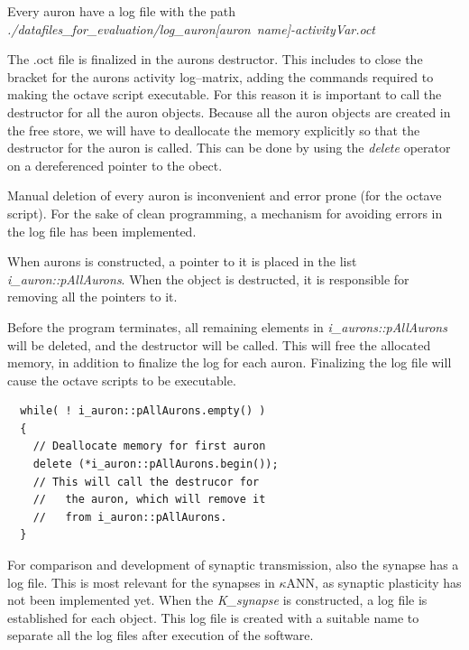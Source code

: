 Every auron have a log file with the path \\ \mbox{\emph{./datafiles\_for\_evaluation/log\_auron[auron name]-activityVar.oct }}

The .oct file is finalized in the aurons destructor. This includes to close the bracket for the aurons activity log--matrix, adding the commands required to making the octave script executable.
For this reason it is important to call the destructor for all the auron objects. 
Because all the auron objects are created in the free store, we will have to deallocate the memory explicitly so that the destructor for the auron is called. 
This can be done by using the \emph{delete} operator on a dereferenced pointer to the obect.

Manual deletion of every auron is inconvenient and error prone (for the octave script). 
For the sake of clean programming, a mechanism for avoiding errors in the log file has been implemented.

When aurons is constructed, a pointer to it is placed in the list \emph{i\_auron::pAllAurons}.
When the object is destructed, it is responsible for removing all the pointers to it.

Before the program terminates, all remaining elements in \emph{i\_aurons::pAllAurons} will be deleted, and the destructor will be called.
This will free the allocated memory, in addition to finalize the log for each auron.
Finalizing the log file will cause the octave scripts to be executable.

\begin{lstlisting}
  while( ! i_auron::pAllAurons.empty() ) 
  { 
    // Deallocate memory for first auron
    delete (*i_auron::pAllAurons.begin()); 
    // This will call the destrucor for
    //   the auron, which will remove it
    //   from i_auron::pAllAurons.
  }   
\end{lstlisting}

For comparison and development of synaptic transmission, also the synapse has a log file. 
This is most relevant for the synapses in $\kappa$ANN, as synaptic plasticity has not been implemented yet.
When the \emph{K\_synapse} is constructed, a log file is established for each object. This log file is created with a suitable name to separate all the log files after execution of the software.

